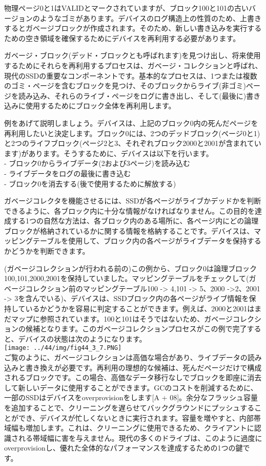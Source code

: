 物理ページ0と1はVALIDとマークされていますが、ブロック100と101の古いバージョンのようなゴミがあります。デバイスのログ構造上の性質のため、上書きするとガベージブロックが作成されます。そのため、新しい書き込みを実行するための空き領域を確保するためにデバイスを再利用する必要があります。

ガベージ・ブロック(デッド・ブロックとも呼ばれます)を見つけ出し、将来使用するためにそれらを再利用するプロセスは、ガベージ・コレクションと呼ばれ、現代のSSDの重要なコンポーネントです。基本的なプロセスは、1つまたは複数のゴミ・ページを含むブロックを見つけ、そのブロックからライブ(非ゴミ)ページを読み込み、それらのライブ・ページをログに書き出し、そして(最後に)書き込みに使用するためにブロック全体を再利用します。

例をあげて説明しましょう。デバイスは、上記のブロック0内の死んだページを再利用したいと決定します。ブロック0には、2つのデッドブロック(ページ0と1)と2つのライフブロック(ページ2と3、それぞれブロック2000と2001が含まれています)があります。そうするために、デバイスは以下を行います。\\
- ブロック0からライブデータ(2および3ページ)を読み込む\\
- ライブデータをログの最後に書き込む\\
- ブロック0を消去する(後で使用するために解放する)

ガベージコレクタを機能させるには、SSDが各ページがライブかデッドかを判断できるように、各ブロック内に十分な情報がなければなりません。この目的を達成する1つの自然な方法は、各ブロック内のある場所に、各ページ内にどの論理ブロックが格納されているかに関する情報を格納することです。デバイスは、マッピングテーブルを使用して、ブロック内の各ページがライブデータを保持するかどうかを判断できます。

(ガベージコレクションが行われる前の)この例から、ブロック0は論理ブロック100,101,2000,2001を保持していました。マッピングテーブルをチェックして(ガベージコレクション前のマッピングテーブル100
-\textgreater{} 4,101 -\textgreater{} 5、2000 -\textgreater2、2001
-\textgreater{}
3を含んでいる)、デバイスは、SSDブロック内の各ページがライブ情報を保持しているかどうかを容易に判定することができます。例えば、2000と2001はまだマップに参照されています。100と101はそうではないため、ガベージコレクションの候補となります。このガベージコレクションプロセスがこの例で完了すると、デバイスの状態は次のようになります。\\
\texttt{[image: ../44/img/fig44\_3\_7.PNG]}\\
ご覧のように、ガベージコレクションは高価な場合があり、ライブデータの読み込みと書き換えが必要です。再利用の理想的な候補は、死んだページだけで構成されるブロックです。この場合、高価なデータ移行なしでブロックを即座に消去して新しいデータに使用することができます。GCのコストを削減するために、一部のSSDはデバイスをoverprovisionをします{[}A
+
08{]}。余分なフラッシュ容量を追加することで、クリーニングを遅らせてバックグラウンドにプッシュすることができ、デバイスが忙しくないときに実行されます。容量を増やすと、内部帯域幅も増加します。これは、クリーニングに使用できるため、クライアントに認識される帯域幅に害を与えません。現代の多くのドライブは、このように過度にoverprovisionし、優れた全体的なパフォーマンスを達成するための1つの鍵です。


